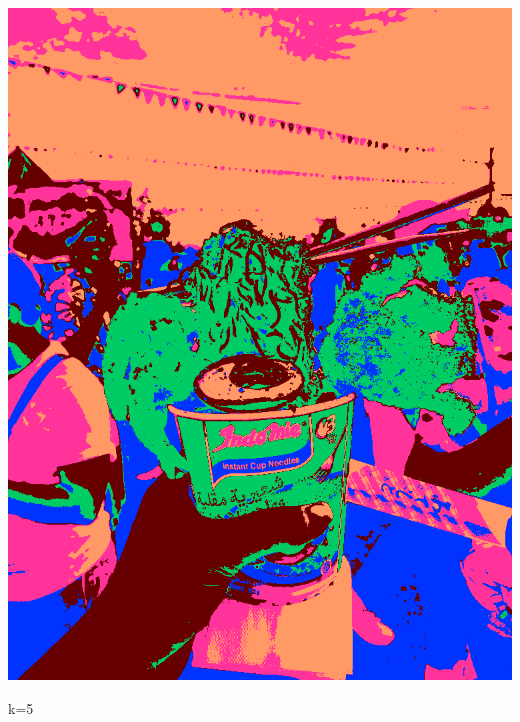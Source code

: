 \documentclass{article}
\begin{document}
\begin{newpage}
\begin{center}
\begin{minipage}{0.8\textwidth}
\begin{center}
\begin{minipage}{0.3\linewidth}
                \centerline{\includegraphics[width=\textwidth]{src/ramen_c5_output.png}}
                \centerline{k=5}
            \end{minipage}
            \begin{minipage}{0.3\linewidth}
                \vspace{\gap}

\end{minipage}
\end{center}
\end{minipage}
\end{center}
\end{newpage}
\end{document}
